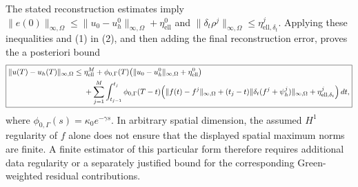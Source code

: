 \documentclass[11pt]{article}
\begin{document}
The stated reconstruction estimates imply \(\|e(0)\|_{\infty,\Omega}\leq\|u_0-u_h^0\|_{\infty,\Omega}+\eta_{\mathrm{ell}}^0\) and \(\|\delta_t\rho^j\|_{\infty,\Omega}\leq\eta_{\mathrm{ell},\delta_t}^j\). Applying these inequalities and (1) in (2), and then adding the final reconstruction error, proves the a posteriori bound
\[
\boxed{\begin{aligned}
\|u(T)-u_h(T)\|_{\infty,\Omega}\leq{}&\eta_{\mathrm{ell}}^M+\phi_{0,\Gamma}(T)\bigl(\|u_0-u_h^0\|_{\infty,\Omega}+\eta_{\mathrm{ell}}^0\bigr)\\
&+\sum_{j=1}^M\int_{t_{j-1}}^{t_j}\phi_{0,\Gamma}(T-t)\Bigl(\|f(t)-f^j\|_{\infty,\Omega}+(t_j-t)\|\delta_t(f^j+\psi_h^j)\|_{\infty,\Omega}+\eta_{\mathrm{ell},\delta_t}^j\Bigr)\,dt,
\end{aligned}}
\]
where \(\phi_{0,\Gamma}(s)=\kappa_0e^{-\gamma s}\). In arbitrary spatial dimension, the assumed \(H^1\) regularity of \(f\) alone does not ensure that the displayed spatial maximum norms are finite. A finite estimator of this particular form therefore requires additional data regularity or a separately justified bound for the corresponding Green-weighted residual contributions.
\end{document}
